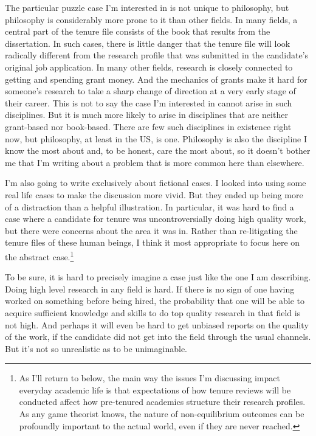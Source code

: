 \documentclass[
  11pt,
  letterpaper,
  DIV=11,
  numbers=noendperiod,
  twoside]{scrartcl}
\begin{document}
The particular puzzle case I'm interested in is not unique to
philosophy, but philosophy is considerably more prone to it than other
fields. In many fields, a central part of the tenure file consists of
the book that results from the dissertation. In such cases, there is
little danger that the tenure file will look radically different from
the research profile that was submitted in the candidate's original job
application. In many other fields, research is closely connected to
getting and spending grant money. And the mechanics of grants make it
hard for someone's research to take a sharp change of direction at a
very early stage of their career. This is not to say the case I'm
interested in cannot arise in such disciplines. But it is much more
likely to arise in disciplines that are neither grant-based nor
book-based. There are few such disciplines in existence right now, but
philosophy, at least in the US, is one. Philosophy is also the
discipline I know the most about and, to be honest, care the most about,
so it doesn't bother me that I'm writing about a problem that is more
common here than elsewhere.

I'm also going to write exclusively about fictional cases. I looked into
using some real life cases to make the discussion more vivid. But they
ended up being more of a distraction than a helpful illustration. In
particular, it was hard to find a case where a candidate for tenure was
uncontroversially doing high quality work, but there were concerns about
the area it was in. Rather than re-litigating the tenure files of these
human beings, I think it most appropriate to focus here on the abstract
case.\footnote{As I'll return to below, the main way the issues I'm
  discussing impact everyday academic life is that expectations of how
  tenure reviews will be conducted affect how pre-tenured academics
  structure their research profiles. As any game theorist knows, the
  nature of non-equilibrium outcomes can be profoundly important to the
  actual world, even if they are never reached.}

To be sure, it is hard to precisely imagine a case just like the one I
am describing. Doing high level research in any field is hard. If there
is no sign of one having worked on something before being hired, the
probability that one will be able to acquire sufficient knowledge and
skills to do top quality research in that field is not high. And perhaps
it will even be hard to get unbiased reports on the quality of the work,
if the candidate did not get into the field through the usual channels.
But it's not so unrealistic as to be unimaginable.
\end{document}
